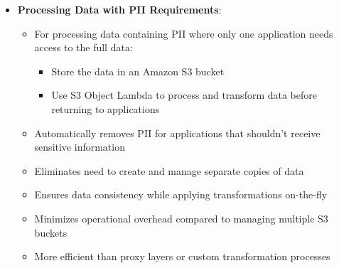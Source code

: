 \documentclass[11pt,a4paper]{report}
\begin{document}
\begin{itemize}
\begin{itemize}
\begin{itemize}
  \item Configure expiration rules for temporary files (e.g., image files) after their useful life (e.g., 30 days)
\end{itemize}
  \item Combines with serverless processing (Lambda) for comprehensive data management
  \item Optimizes storage costs by matching storage class to actual access patterns
  \item Better than keeping all data in S3 Standard regardless of access frequency
  \item More cost-effective than using S3 One Zone-IA or S3 Standard-IA for very rarely accessed data
  \item \textbf{S3 Object Lock for Public Information Sharing}:
\begin{itemize}
  \item When combined with S3 Versioning enabled and configured for static website hosting, provides a secure way to share files with the public that cannot be modified or deleted
  \item Can set retention periods in accordance with designated future dates to prevent modifications or deletions
  \item Perfect solution for legal or compliance scenarios requiring immutable public records
  \item Setting an S3 bucket policy to allow read-only access ensures the public can view files without modifying them
  \item More secure and efficient than using IAM permissions for public access control
\end{itemize}
\end{itemize}
  \item \textbf{Processing Data with PII Requirements}:
\begin{itemize}
  \item For processing data containing PII where only one application needs access to the full data:
\begin{itemize}
  \item Store the data in an Amazon S3 bucket
  \item Use S3 Object Lambda to process and transform data before returning to applications
\end{itemize}
  \item Automatically removes PII for applications that shouldn't receive sensitive information
  \item Eliminates need to create and manage separate copies of data
  \item Ensures data consistency while applying transformations on-the-fly
  \item Minimizes operational overhead compared to managing multiple S3 buckets
  \item More efficient than proxy layers or custom transformation processes
\end{itemize}
\end{itemize}
\end{document}
